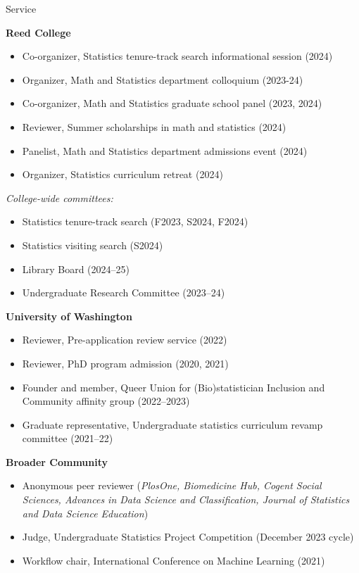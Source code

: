 \documentclass{resume} %
\begin{document}
\begin{rSection}{Service}

\textbf{Reed College}
\begin{itemize}
\item Co-organizer, Statistics tenure-track search informational session (2024)
\item Organizer, Math and Statistics department colloquium (2023-24)
\item Co-organizer, Math and Statistics graduate school panel (2023, 2024)
\item Reviewer, Summer scholarships in math and statistics (2024)
\item Panelist, Math and Statistics department admissions event (2024)
\item Organizer, Statistics curriculum retreat (2024)
\end{itemize}

\textit{College-wide committees:}
\begin{itemize}
\item Statistics tenure-track search (F2023, S2024, F2024)
\item Statistics visiting search (S2024)
\item Library Board (2024--25)
\item Undergraduate Research Committee (2023--24)
\end{itemize}

\textbf{University of Washington}
\begin{itemize}
\item Reviewer, Pre-application review service (2022)
\item Reviewer, PhD program admission (2020, 2021)
\item Founder and member, Queer Union for (Bio)statistician Inclusion and Community affinity group (2022--2023)
\item Graduate representative, Undergraduate statistics curriculum revamp committee (2021--22)
\end{itemize}

\textbf{Broader Community}
\begin{itemize}
\item Anonymous peer reviewer ({\it PlosOne, Biomedicine Hub, Cogent Social Sciences, Advances in Data Science and Classification, Journal of Statistics and Data Science Education})
\item Judge, Undergraduate Statistics Project Competition (December 2023 cycle)
\item Workflow chair, International Conference on Machine Learning (2021)
\end{itemize}




\end{rSection}
\end{document}
